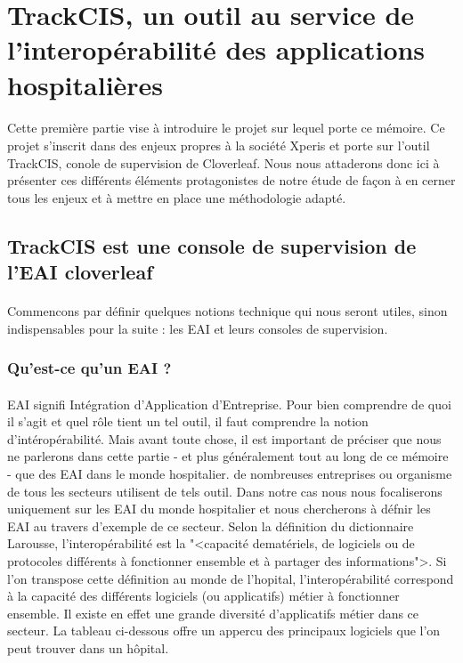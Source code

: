 \section{TrackCIS, un outil au service de l'interopérabilité des applications hospitalières}
	\paragraph{}
	Cette première partie vise à introduire le projet sur lequel porte ce mémoire.
	Ce projet s'inscrit dans des enjeux propres à la société Xperis et porte sur
	l'outil TrackCIS, conole de supervision de Cloverleaf. Nous nous attaderons
	donc ici à présenter ces différents éléments protagonistes de notre étude de
	façon à en cerner tous les enjeux et à mettre en place une méthodologie adapté.

	\subsection{TrackCIS est une console de supervision de l'EAI cloverleaf}
		\paragraph{} 
		Commencons par définir quelques notions technique qui nous seront utiles,
		sinon indispensables pour la suite : les EAI et leurs consoles de supervision.
		 
		\subsubsection{Qu'est-ce qu'un EAI ?}
			\paragraph{}%
			EAI signifi Intégration d'Application d'Entreprise. Pour bien comprendre de
			quoi il s'agit et quel rôle tient un tel outil, il faut comprendre la notion
			d'intéropérabilité. Mais avant toute chose, il est important de préciser que
			nous ne parlerons dans cette partie - et plus généralement tout au long de ce
			mémoire - que des EAI dans le monde hospitalier. de nombreuses entreprises ou
			organisme de tous les secteurs utilisent de tels outil. Dans notre cas nous nous
			focaliserons uniquement sur les EAI du monde hospitalier et nous
			chercherons à défnir les EAI au travers d'exemple de ce secteur.\newline
			Selon la définition du dictionnaire Larousse, l'interopérabilité est la "<capacité dematériels, de logiciels ou de protocoles différents à
			fonctionner ensemble et à partager des informations">. Si l'on transpose
			cette définition au monde de l'hopital, l'interopérabilité correspond à la
			capacité des différents logiciels (ou applicatifs) métier à fonctionner
			ensemble. Il existe en effet une grande diversité d'applicatifs métier dans
			ce secteur. La tableau ci-dessous offre un appercu des principaux logiciels
			que l'on peut trouver dans un hôpital.\newline
			

